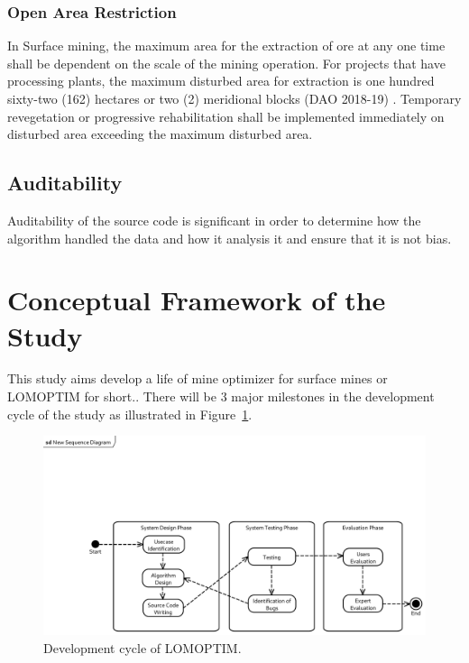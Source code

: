 \documentclass[12pt]{report}
\begin{document}
\subsubsection{Open Area Restriction}
In Surface mining, the maximum area for the extraction of ore at any one time shall be dependent on the scale of the mining operation.
For projects that have processing plants, the maximum disturbed area for extraction is one hundred sixty-two (162) hectares or two (2) meridional blocks (DAO 2018-19) \cite{DAO2018-19}.
Temporary revegetation or progressive rehabilitation shall be implemented immediately on disturbed area exceeding the maximum disturbed area.

\subsection{Auditability}

Auditability of the source code is significant in order to determine how the algorithm handled the data and how it analysis it and ensure that it is not bias.

\section{Conceptual Framework of the Study}

This study aims develop a life of mine optimizer for surface mines or LOMOPTIM for short..
There will be 3 major milestones in the development cycle of the study as illustrated in Figure~\ref{fig:conceptual_framework}.

\begin{figure}[p]
    \centering
    \includegraphics[clip, trim=30mm 2mm 2mm 33mm, width=\linewidth]{img/conceptual_framework.pdf}
    \caption{Development cycle of LOMOPTIM.}
    \label{fig:conceptual_framework}
\end{figure}
\end{document}
